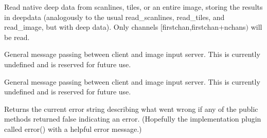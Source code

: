 \NEW
Read native deep data from scanlines, tiles, or an entire image, 
storing the results in {\cf deepdata} (analogously to the usual
{\cf read_scanlines}, {\cf read_tiles},
and {\cf read_image}, but with deep data).
Only channels $[${\cf firstchan},{\cf firstchan+nchans}$)$
will be read.
\apiend

General message passing between client and image input server.
This is currently undefined and is reserved for future use.
\apiend

General message passing between client and image input server.
This is currently undefined and is reserved for future use.
\apiend

Returns the current error string describing what went wrong if
any of the public methods returned {\kw false} indicating an error.
(Hopefully the implementation plugin called {\kw error()} with a
helpful error message.)
\apiend




\chapwidthend
